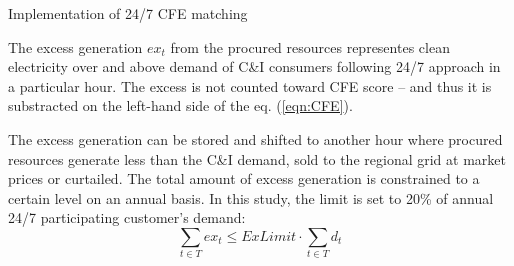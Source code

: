 \begin{frame}{Implementation of 24/7 CFE matching}

  {\small

  The excess generation $ex_t$ from the procured resources representes clean electricity over
  and above demand of C\&I consumers following 24/7 approach in a particular hour. 
  The \alert{excess is not counted toward CFE score} -- 
  and thus it is substracted on the left-hand side of the eq. (\ref{eqn:CFE}).

  The excess generation can be stored and shifted to another hour where procured resources 
  generate less than the C\&I demand, sold to the regional grid at market prices or curtailed. 
  The total amount of excess generation is constrained to a certain level on an annual basis. 
  In this study, the limit is set to 20\% of annual 24/7 participating customer's demand:
  \vspace{0.1cm}
  \begin{equation}
  \sum_{t\in T} ex_t \leq ExLimit \cdot \sum_{t\in T} d_t
  \label{eqn:excess}
  \end{equation}

  \noindent{}

  }
\end{frame}



